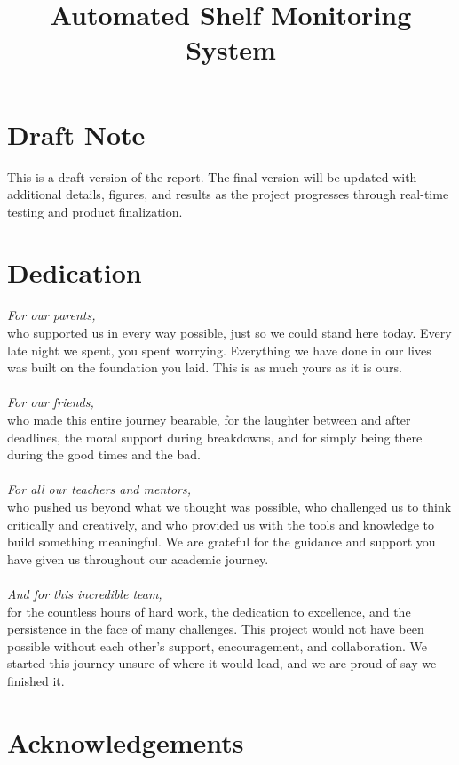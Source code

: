 \documentclass[12pt,twosided]{report}
\title{Automated Shelf Monitoring System}
\begin{document}

\chapter*{Draft Note}

This is a draft version of the report. The final version will be updated with additional details, figures, and results as the project progresses through real-time testing and product finalization.

\chapter*{Dedication}

\textit{For our parents,} \\
who supported us in every way possible, just so we could stand here today. Every late night we spent, you spent worrying. Everything we have done in our lives was built on the foundation you laid. This is as much yours as it is ours.\\[1em]
\\
\textit{For our friends,} \\
who made this entire journey bearable, for the laughter between and after deadlines, the moral support during breakdowns, and for simply being there during the good times and the bad.\\[1em]
\\
\textit{For all our teachers and mentors,} \\
who pushed us beyond what we thought was possible, who challenged us to think critically and creatively, and who provided us with the tools and knowledge to build something meaningful. We are grateful for the guidance and support you have given us throughout our academic journey.\\[1em]
\\
\textit{And for this incredible team,} \\
for the countless hours of hard work, the dedication to excellence, and the persistence in the face of many challenges. This project would not have been possible without each other's support, encouragement, and collaboration. 
We started this journey unsure of where it would lead, and we are proud of say we finished it.

\chapter*{Acknowledgements}
\end{document}
